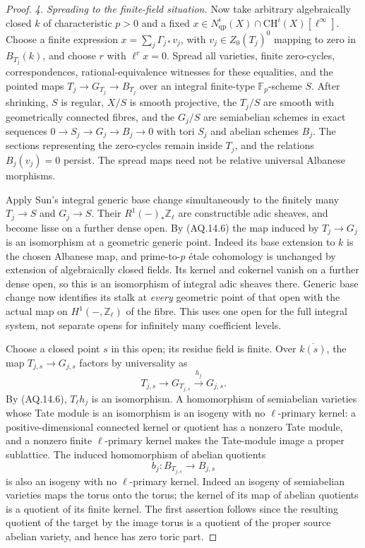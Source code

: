 \documentclass[11pt,a4paper]{article}
\theoremstyle{definition}\newtheorem{definition}[theorem]{Definition}
\theoremstyle{remark}\newtheorem{remark}[theorem]{Remark}
\begin{document}
\begin{proof}
\emph{4. Spreading to the finite-field situation.}
Now take arbitrary algebraically closed $k$ of characteristic
$p>0$ and a fixed
$x\in N^i_{\mathrm{qp}}(X)\cap\mathrm{CH}^i(X)[\ell^\infty]$.
Choose a finite expression
$x=\sum_j\Gamma_{j*}v_j$, with $v_j\in Z_0(T_j)^0$
mapping to zero in $B_{T_j}(k)$, and choose $r$ with
$\ell^r x=0$. Spread all varieties, finite zero-cycles,
correspondences, rational-equivalence witnesses for these
equalities, and the pointed maps
$T_j\to G_{T_j}\to B_{T_j}$ over an integral finite-type
$\mathbb F_p$-scheme $S$. After shrinking, $S$ is regular,
$X/S$ is smooth projective, the $T_j/S$ are smooth with
geometrically connected fibres, and the $G_j/S$ are
semiabelian schemes in exact sequences
$0\to S_j\to G_j\to B_j\to0$ with tori $S_j$ and
abelian schemes $B_j$. The sections representing the
zero-cycles remain inside $T_j$, and the relations
$B_j(v_j)=0$ persist. The spread maps need not be
relative universal Albanese morphisms.

Apply Sun's integral generic base change simultaneously to
the finitely many $T_j\to S$ and $G_j\to S$. Their
$R^1(-)_*\mathbb Z_\ell$ are constructible adic sheaves,
and become lisse on a further dense open. By (AQ.14.6)
the map induced by $T_j\to G_j$ is an isomorphism at
a geometric generic point. Indeed its base extension
to $k$ is the chosen Albanese map, and prime-to-$p$
\'etale cohomology is unchanged by extension of
algebraically closed fields. Its kernel and cokernel
vanish on a further dense open, so this is an
isomorphism of integral adic sheaves there. Generic
base change now identifies its stalk at \emph{every}
geometric point of that open with the actual map
on $H^1(-,\mathbb Z_\ell)$ of the fibre. This uses one
open for the full integral system, not separate opens
for infinitely many coefficient levels.

Choose a closed point $s$ in this open; its residue
field is finite. Over $\overline{k(s)}$, the map
$T_{j,s}\to G_{j,s}$ factors by universality as
\[
 T_{j,s}\longrightarrow G_{T_{j,s}}
                  \xrightarrow{h_j}G_{j,s}.
\]
By (AQ.14.6), $T_\ell h_j$ is an isomorphism. A
homomorphism of semiabelian varieties whose Tate module
is an isomorphism is an isogeny with no $\ell$-primary
kernel: a positive-dimensional connected kernel or
quotient has a nonzero Tate module, and a nonzero finite
$\ell$-primary kernel makes the Tate-module image a
proper sublattice. The induced homomorphism of abelian
quotients
\[
 b_j:B_{T_{j,s}}\longrightarrow B_{j,s}
\]
is also an isogeny with no $\ell$-primary kernel.
Indeed an isogeny of semiabelian varieties maps the
torus onto the torus; the kernel of its map of abelian
quotients is a quotient of its finite kernel. The first
assertion follows since the resulting quotient of the
target by the image torus is a quotient of the proper
source abelian variety, and hence has zero toric part.


\end{proof}
\end{document}

